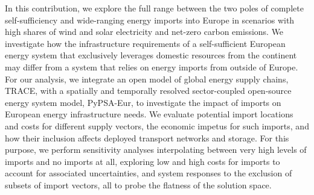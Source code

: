 In this contribution, we explore the full range between the two poles of
complete self-sufficiency and wide-ranging energy imports into Europe in
scenarios with high shares of wind and solar electricity and net-zero carbon
emissions. We investigate how the infrastructure requirements of a
self-sufficient European energy system that exclusively leverages domestic
resources from the continent may differ from a system that relies on energy
imports from outside of Europe. For our analysis, we integrate an open model of
global energy supply chains, TRACE,\cite{hamppImportOptions2023} with a
spatially and temporally resolved sector-coupled open-source energy system
model, PyPSA-Eur,\cite{PyPSAEurSecSectorCoupled} to investigate the impact of
imports on European energy infrastructure needs. We evaluate potential import
locations and costs for different supply vectors, the economic impetus
for such
imports, and how their inclusion affects deployed transport networks and
storage. For this purpose, we perform sensitivity analyses interpolating between
very high levels of imports and no imports at all, exploring low and high costs for
imports to account for associated uncertainties, and system responses to the
exclusion of subsets of import vectors, all to probe the flatness of the
solution space.


